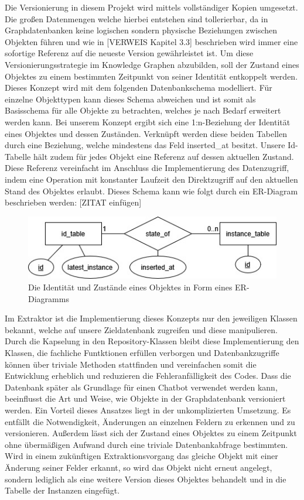 Die Versionierung in diesem Projekt wird mittels vollständiger Kopien umgesetzt. Die großen Datenmengen welche hierbei entstehen sind tollerierbar, da in Graphdatenbanken keine logischen sondern physische Beziehungen zwischen Objekten führen und wie in [VERWEIS Kapitel 3.3] beschrieben wird immer eine sofortige Referenz auf die neueste Version gewährleistet ist. Um diese Versionierungsstrategie im Knowledge Graphen abzubilden, soll der Zustand eines Objektes zu einem bestimmten Zeitpunkt von seiner Identität entkoppelt werden. Dieses Konzept wird mit dem folgenden Datenbankschema modelliert. Für einzelne Objekttypen kann dieses Schema abweichen und ist somit als Basisschema für alle Objekte zu betrachten, welches je nach Bedarf erweitert werden kann. Bei unserem Konzept ergibt sich eine 1:n-Beziehung der Identität eines Objektes und dessen Zuständen. Verknüpft werden diese beiden Tabellen durch eine Beziehung, welche mindestens das Feld inserted\_at besitzt. Unsere Id-Tabelle hält zudem für jedes Objekt eine Referenz auf dessen aktuellen Zustand. Diese Referenz vereinfacht im Anschluss die Implementierung des Datenzugriff, indem eine Operation mit konstanter Laufzeit den Direktzugriff auf den aktuellen Stand des Objektes erlaubt. Dieses Schema kann wie folgt durch ein ER-Diagram beschrieben werden: [ZITAT einfügen]
\begin{figure}[H]
\centering
\includegraphics[scale=.6]{dateien/identity_instance_er.jpg}
\caption{Die Identität und Zustände eines Objektes in Form eines ER-Diagramms}
\label{fig:meine-grafik}
\end{figure}
Im Extraktor ist die Implementierung dieses Konzepts nur den jeweiligen Klassen bekannt, welche auf unsere Zieldatenbank zugreifen und diese manipulieren. Durch die Kapselung in den Repository-Klassen bleibt diese Implementierung den Klassen, die fachliche Funtktionen erfüllen verborgen und Datenbankzugriffe können über triviale Methoden stattfinden und vereinfachen somit die Entwicklung erheblich und reduzieren die Fehleranfälligkeit des Codes.
Dass die Datenbank später als Grundlage für einen Chatbot verwendet werden kann, beeinflusst die Art und Weise, wie Objekte in der Graphdatenbank versioniert werden. Ein Vorteil dieses Ansatzes liegt in der unkomplizierten Umsetzung. Es entfällt die Notwendigkeit, Änderungen an einzelnen Feldern zu erkennen und zu versionieren. Außerdem lässt sich der Zustand eines Objektes zu einem Zeitpunkt ohne übermäßigen Aufwand durch eine triviale Datenbankabfrage bestimmten.
Wird in einem zukünftigen Extraktionsvorgang das gleiche Objekt mit einer Änderung seiner Felder erkannt, so wird das Objekt nicht erneut angelegt, sondern lediglich als eine weitere Version dieses Objektes behandelt und in die Tabelle der Instanzen eingefügt.

